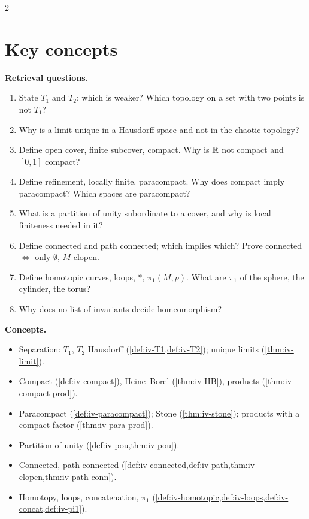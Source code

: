 \begin{paracol}{2}
\section*{Key concepts}
\begin{keyconcepts}
\textbf{Retrieval questions.}
\begin{enumerate}
  \item State $T_1$ and $T_2$; which is weaker? Which topology on a set with two points is not $T_1$?
  \item Why is a limit unique in a Hausdorff space and not in the chaotic topology?
  \item Define open cover, finite subcover, compact. Why is $\mathbb{R}$ not compact and $[0,1]$ compact?
  \item Define refinement, locally finite, paracompact. Why does compact imply paracompact? Which spaces are paracompact?
  \item What is a partition of unity subordinate to a cover, and why is local finiteness needed in it?
  \item Define connected and path connected; which implies which? Prove connected $\Leftrightarrow$ only $\emptyset$, $M$ clopen.
  \item Define homotopic curves, loops, $*$, $\pi_1(M,p)$. What are $\pi_1$ of the sphere, the cylinder, the torus?
  \item Why does no list of invariants decide homeomorphism?
\end{enumerate}
\textbf{Concepts.}
\begin{itemize}
  \item Separation: $T_1$, $T_2$ Hausdorff (\cref{def:iv-T1,def:iv-T2}); unique limits (\cref{thm:iv-limit}).
  \item Compact (\cref{def:iv-compact}), Heine--Borel (\cref{thm:iv-HB}), products (\cref{thm:iv-compact-prod}).
  \item Paracompact (\cref{def:iv-paracompact}); Stone (\cref{thm:iv-stone}); products with a compact factor (\cref{thm:iv-para-prod}).
  \item Partition of unity (\cref{def:iv-pou,thm:iv-pou}).
  \item Connected, path connected (\cref{def:iv-connected,def:iv-path,thm:iv-clopen,thm:iv-path-conn}).
  \item Homotopy, loops, concatenation, $\pi_1$ (\cref{def:iv-homotopic,def:iv-loops,def:iv-concat,def:iv-pi1}).
\end{itemize}
\end{keyconcepts}

\flushside
\end{paracol}
